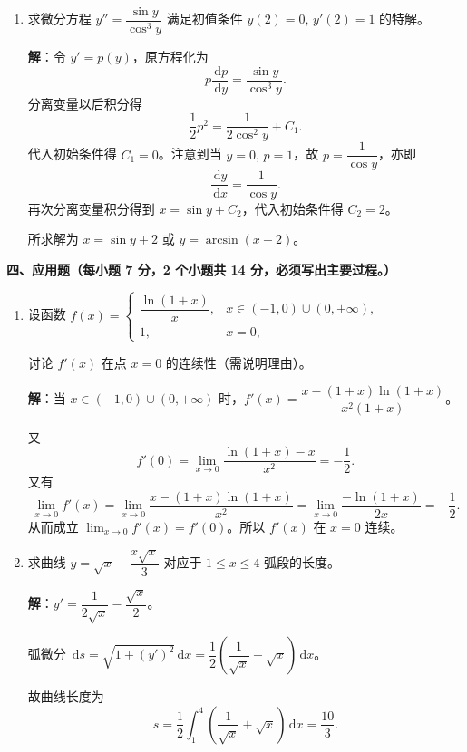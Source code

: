 \documentclass[a4paper,11pt]{ctexart}
\newcommand{\dd}{\,\mathrm{d}}
\begin{document}
\begin{enumerate}[label=\arabic*., start=11, leftmargin=2em, itemsep=0.9em, topsep=0.5em]
  \textbf{解法二}：令 $x=1/t$，有
  \[
    \int_0^1\frac{1}{x\sqrt{x^2+1}}\dd x = \int_1^{+\infty}\frac{1}{\sqrt{t^2+1}}\dd t = \left.\ln\bigl(t+\sqrt{t^2+1}\bigr)\right|_1^{+\infty} = +\infty.
  \]
  原反常积分发散。

  \textbf{解法三}：$\dfrac{1}{x\sqrt{x^2+1}}\sim\dfrac{1}{x}\ (x\to 0^+)$，积分 $\displaystyle\int_0^1\frac{1}{x}\dd x$ 发散，故 $\displaystyle\int_0^1\frac{1}{x\sqrt{x^2+1}}\dd x$ 发散。

  \item 求微分方程 $y''=\dfrac{\sin y}{\cos^3 y}$ 满足初值条件 $y(2)=0,\,y'(2)=1$ 的特解。

  \textbf{解}：令 $y'=p(y)$，原方程化为
  \[
    p\frac{\dd p}{\dd y} = \frac{\sin y}{\cos^3 y}.
  \]
  分离变量以后积分得
  \[
    \frac{1}{2}p^2 = \frac{1}{2\cos^2 y} + C_1.
  \]
  代入初始条件得 $C_1=0$。注意到当 $y=0,\,p=1$，故 $p=\dfrac{1}{\cos y}$，亦即
  \[
    \frac{\dd y}{\dd x} = \frac{1}{\cos y}.
  \]
  再次分离变量积分得到 $x=\sin y+C_2$，代入初始条件得 $C_2=2$。

  所求解为 $x=\sin y+2$ 或 $y=\arcsin(x-2)$。
\end{enumerate}

\vspace{0.8em}

\textbf{四、应用题（每小题 7 分，2 个小题共 14 分，必须写出主要过程。）}

\begin{enumerate}[label=\arabic*., start=17, leftmargin=2em, itemsep=0.9em, topsep=0.5em]
  \item 设函数 $f(x)=\begin{cases}\dfrac{\ln(1+x)}{x}, & x\in(-1,0)\cup(0,+\infty),\\[0.5em] 1, & x=0,\end{cases}$

  讨论 $f'(x)$ 在点 $x=0$ 的连续性（需说明理由）。

  \textbf{解}：当 $x\in(-1,0)\cup(0,+\infty)$ 时，$f'(x)=\dfrac{x-(1+x)\ln(1+x)}{x^2(1+x)}$。

  又
  \[
    f'(0)=\lim_{x\to 0}\frac{\ln(1+x)-x}{x^2}=-\frac{1}{2}.
  \]
  又有
  \[
    \lim_{x\to 0}f'(x)=\lim_{x\to 0}\frac{x-(1+x)\ln(1+x)}{x^2}=\lim_{x\to 0}\frac{-\ln(1+x)}{2x}=-\frac{1}{2}.
  \]
  从而成立 $\displaystyle\lim_{x\to 0}f'(x)=f'(0)$。所以 $f'(x)$ 在 $x=0$ 连续。

  \item 求曲线 $y=\sqrt{x}-\dfrac{x\sqrt{x}}{3}$ 对应于 $1\le x\le 4$ 弧段的长度。

  \textbf{解}：$y'=\dfrac{1}{2\sqrt{x}}-\dfrac{\sqrt{x}}{2}$。

  弧微分 $\dd s=\sqrt{1+(y')^2}\dd x=\dfrac{1}{2}\left(\dfrac{1}{\sqrt{x}}+\sqrt{x}\right)\dd x$。

  故曲线长度为
  \[
    s=\frac{1}{2}\int_1^4\left(\frac{1}{\sqrt{x}}+\sqrt{x}\right)\dd x = \frac{10}{3}.
  \]
\end{enumerate}
\end{document}
